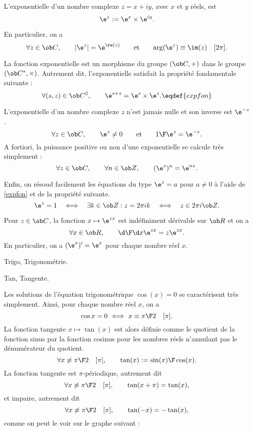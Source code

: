 \Definition [] L'exponentielle d'un nombre complexe $z=x+iy$, avec $x$ et $y$ r\'eels, est 
$$
\e^z:=\e^x\times\e^{iy}.
$$

\noindent
En particulier, on a 
$$
{\forall z\in\ob C}, \qquad {|\e^z|=\e^{\re(z)}}\qquad\mbox{et}
\qquad{\arg(\e^z)\equiv\im(z)\quad[2\pi]}.
$$


\bigskip
\noindent
La fonction exponentielle est un morphisme du groupe $(\ob C,+)$ dans le groupe $(\ob C^*,\times)$. Autrement dit, 
l'exponentielle satisfait la propri\'et\'e fondamentale suivante : 
$$
{\forall (s,z)\in\ob C^2}, \qquad{\e^{s+z}=\e^s\times\e^z}.\eqdef{expfon}
$$


\bigskip
\noindent
L'exponentielle d'un nombre complexe $z$ n'est jamais nulle et son inverse est $\e^{-z}$.  
$$
{\forall z\in\ob C}, \qquad {\e^z\neq0}\qquad\mbox{et}\qquad {{1\F\e^z}=\e^{-z}}.
$$
A fortiori, la puissance positive ou non d'une exponentielle se calcule tr\`es simplement : 
$$
{\forall z\in\ob C},\qquad {\forall n\in\ob Z},\qquad {(\e^z)^n=\e^{nz}}. 
$$

Enfin, on r\'esoud facilement les \'equations du type $\e^z=a$ pour $a\neq0$ \`a l'aide de \eqref{expfon} et de la propri\'et\'e suivante. 
$$
{
\e^z=1\quad \Longleftrightarrow\quad \exists k\in\ob Z: z=2\pi i k\quad \Longleftrightarrow\quad z\in2\pi i\ob Z}.
$$


\Propriete [] Pour $z\in\ob C$, la fonction {$x\mapsto \e^{zx}$ est ind\'efiniment d\'erivable sur $\ob R$} et on a 
$$
\forall x\in\ob R, \qquad {{\d\F\d x}\e^{zx}=z\e^{zx}}.
$$
En particulier, on a $(\e^x)'=\e^x$ pour chaque nombre r\'eel $x$. 

\Section Trigo, Trigonom\'etrie. 

\Subsection Tan, Tangente.

Les solutions de l'\'equation trigonom\'etrique $\cos(x)=0$ se caract\'erisent tr\`es simplement. 
Ainsi, pour chaque nombre r\'eel $x$, on a 
$$
{\cos x=0\ \Longleftrightarrow\ x\equiv {\pi\F2}\quad[\pi]}.
$$
La fonction tangente $x\mapsto\tan(x)$ est alors d\'efinie 
comme le quotient de la fonction sinus par la fonction cosinus pour les nombres r\'eels n'annulant pas le d\'enum\'erateur du quotient. 
$$
{
\forall x\not\equiv {\pi\F2}\quad[\pi]}, \qquad {\tan(x):={\sin(x)\F\cos(x)}}.
$$
La fonction tangente est $\pi$-p\'eriodique, autrement dit 
$$
{
\forall x\not\equiv {\pi\F2}\quad[\pi]}, \qquad {\tan(x+\pi)=\tan(x)},
$$ 
et impaire, autrement dit 
$$
{
\forall x\not\equiv {\pi\F2}\quad[\pi]}, \qquad {\tan(-x)=-\tan(x)}, 
$$
comme on peut le voir sur le graphe suivant : 

